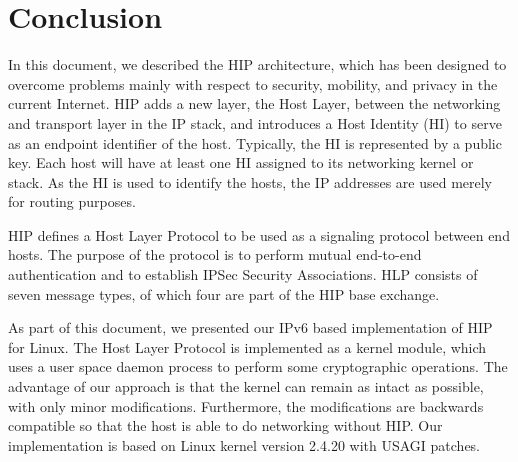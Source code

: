 \section{Conclusion}
\label{sec:conclusion}

In this document, we described the HIP architecture, which has been
designed to overcome problems mainly with respect to security,
mobility, and privacy in the current Internet. HIP adds a new layer,
the Host Layer, between the networking and transport layer in the IP
stack, and introduces a Host Identity (HI) to serve as an endpoint
identifier of the host. Typically, the HI is represented by a public
key. Each host will have at least one HI assigned to its networking
kernel or stack. As the HI is used to identify the hosts, the IP
addresses are used merely for routing purposes.

HIP defines a Host Layer Protocol to be used as a signaling protocol
between end hosts. The purpose of the protocol is to perform mutual
end-to-end authentication and to establish IPSec Security
Associations. HLP consists of seven message types, of which four are
part of the HIP base exchange.

As part of this document, we presented our IPv6 based implementation
of HIP for Linux. The Host Layer Protocol is implemented as a kernel
module, which uses a user space daemon process to perform some
cryptographic operations. The advantage of our approach is that the
kernel can remain as intact as possible, with only minor
modifications. Furthermore, the modifications are backwards compatible
so that the host is able to do networking without HIP. Our
implementation is based on Linux kernel version 2.4.20 with USAGI
patches.
